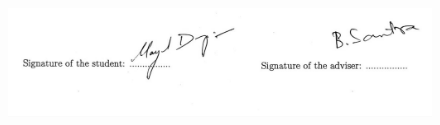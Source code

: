 \vspace*{1cm}

\begin{figure}[H]
\centering
\includegraphics[width=\textwidth]{img/WhatsApp Image 2022-09-29 at 16.47.25.jpeg}
\label{fig:img_target}
\end{figure}


%


